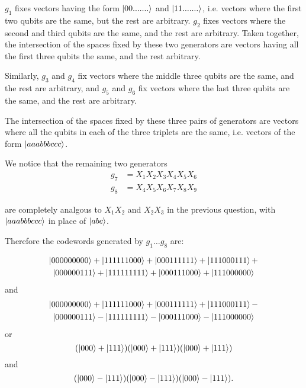 \documentclass[12pt]{extarticle}
\begin{document}
$g_1$ fixes vectors having the form $\ket{00.......}$ and $\ket{11.......}$, i.e. vectors where the first two qubits are the same, but the rest are arbitrary.
$g_2$ fixes vectors where the second and third qubits are the same, and the rest are arbitrary.
Taken together, the intersection of the spaces fixed by these two generators are vectors having all the first three qubits the same, and the rest arbitrary.

Similarly, $g_3$ and $g_4$ fix vectors where the middle three qubits are the same, and the rest are arbitrary,
and $g_5$ and $g_6$ fix vectors where the last three qubits are the same, and the rest are arbitrary.

The intersection of the spaces fixed by these three pairs of generators are vectors where all the qubits
in each of the three triplets are the same, i.e. vectors of the form $\ket{aaabbbccc}$.

We notice that the remaining two generators
\begin{align*}
g_7 & = X_1X_2X_3X_4X_5X_6 \\
g_8 & = X_4X_5X_6X_7X_8X_9
\end{align*}

are completely analgous to $X_1X_2$ and $X_2X_3$ in the previous question,
with $\ket{aaabbbccc}$ in place of $\ket{abc}$.

Therefore the codewords generated by $g_1\ldots g_8$ are:

\begin{multline*}
\ket{000000000} + \ket{111111000} + \ket{000111111} + \ket{111000111} + \\
\ket{000000111} + \ket{111111111} + \ket{000111000} + \ket{111000000}
\end{multline*}
and
\begin{multline*}
\ket{000000000} + \ket{111111000} + \ket{000111111} + \ket{111000111} - \\
\ket{000000111} - \ket{111111111} - \ket{000111000} - \ket{111000000}
\end{multline*}
or
\[
(\ket{000} + \ket{111})(\ket{000} + \ket{111})(\ket{000} + \ket{111})
\]
and
\[
(\ket{000} - \ket{111})(\ket{000} - \ket{111})(\ket{000} - \ket{111}).
\]
\end{document}
